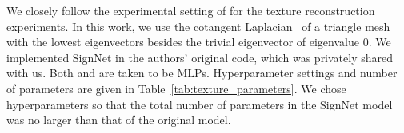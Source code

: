 \documentclass{article} \usepackage{iclr2023_conference,times}
\begin{document}
We closely follow the experimental setting of \cite{koestler2022intrinsic} for the texture reconstruction experiments. In this work, we use the cotangent Laplacian~\citep{rustamov2007laplace} of a triangle mesh with the lowest  eigenvectors besides the trivial eigenvector of eigenvalue 0. We implemented SignNet in the authors' original code, which was privately shared with us. Both  and  are taken to be MLPs. Hyperparameter settings and number of parameters are given in Table~\ref{tab:texture_parameters}. We chose hyperparameters so that the total number of  parameters in the SignNet model was no larger than that of the original model.
\end{document}
